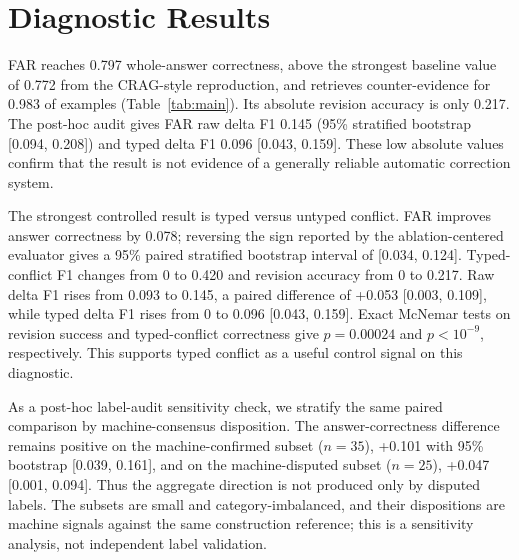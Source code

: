 \documentclass[letterpaper]{article}
\begin{document}
\begin{table}[t]
\centering
\small
\resizebox{\columnwidth}{!}{}
\caption{Machine-seeded Qwen development diagnostic ($n=60$). ``Style'' baselines are scoped reproductions. These are not blind-test or human-gold results.}
\label{tab:main}
\end{table}

\begin{table}[t]
\centering
\small
\resizebox{\columnwidth}{!}{}
\caption{Component ablations on the same diagnostic. The mixed results motivate our narrowed claim.}
\label{tab:ablations}
\end{table}

\section{Diagnostic Results}
FAR reaches 0.797 whole-answer correctness, above the strongest baseline value of 0.772 from the CRAG-style reproduction, and retrieves counter-evidence for 0.983 of examples (Table~\ref{tab:main}). Its absolute revision accuracy is only 0.217. The post-hoc audit gives FAR raw delta F1 0.145 (95\% stratified bootstrap [0.094, 0.208]) and typed delta F1 0.096 [0.043, 0.159]. These low absolute values confirm that the result is not evidence of a generally reliable automatic correction system.

The strongest controlled result is typed versus untyped conflict. FAR improves answer correctness by 0.078; reversing the sign reported by the ablation-centered evaluator gives a 95\% paired stratified bootstrap interval of [0.034, 0.124]. Typed-conflict F1 changes from 0 to 0.420 and revision accuracy from 0 to 0.217. Raw delta F1 rises from 0.093 to 0.145, a paired difference of +0.053 [0.003, 0.109], while typed delta F1 rises from 0 to 0.096 [0.043, 0.159]. Exact McNemar tests on revision success and typed-conflict correctness give $p=0.00024$ and $p<10^{-9}$, respectively. This supports typed conflict as a useful control signal on this diagnostic.

As a post-hoc label-audit sensitivity check, we stratify the same paired comparison by machine-consensus disposition. The answer-correctness difference remains positive on the machine-confirmed subset ($n=35$), +0.101 with 95\% bootstrap [0.039, 0.161], and on the machine-disputed subset ($n=25$), +0.047 [0.001, 0.094]. Thus the aggregate direction is not produced only by disputed labels. The subsets are small and category-imbalanced, and their dispositions are machine signals against the same construction reference; this is a sensitivity analysis, not independent label validation.
\end{document}

